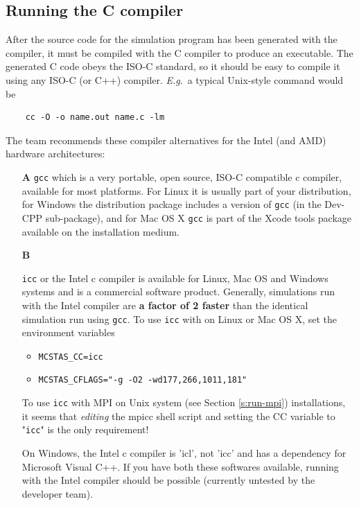 \subsection{Running the C compiler}
\label{s:compile}

After the source code for the simulation program has been generated with
the \MCX compiler, it must be compiled with the C compiler to produce
an executable. The generated C code obeys the ISO-C standard, so it
should be easy to compile it using any ISO-C (or C++) compiler. \textit{E.g}.\ a
typical Unix-style command would be
\begin{verbatim}
    cc -O -o name.out name.c -lm
\end{verbatim}
The \MCX team recommends these compiler alternatives for the Intel
(and AMD) hardware architectures:
\begin{itemize}
\item[\bfseries A]{\verb+gcc+ which is a very portable, open source, ISO-C
    compatible c compiler, available for most platforms. For Linux it
    is usually part of your distribution, for Windows the \MCX
    distribution package includes a version of \verb+gcc+
    (in the Dev-CPP sub-package), and for Mac OS X \verb+gcc+ is part
    of the Xcode tools package available on the installation medium.}
\item[\bfseries B]{\verb+icc+ or the Intel c compiler is available for Linux, Mac
    OS and Windows systems and is a commercial software
    product. Generally, simulations run with the Intel compiler are
    {\bfseries a factor of 2 faster} than the identical simulation run using \verb+gcc+. To use \verb+icc+ with \MCX on Linux or Mac OS X, set the environment variables
    \begin{itemize}
      \item{\verb+MCSTAS_CC=icc+}
      \item{\verb+MCSTAS_CFLAGS="-g -O2 -wd177,266,1011,181"+}
    \end{itemize}
    To use \verb+icc+ with MPI on Unix system (see Section \ref{s:run-mpi})
 installations, it seems that \emph{editing}
    the mpicc shell script and setting the CC variable to "\verb+icc+" is the
    only requirement!}
    On Windows, the Intel c compiler is 'icl', not 'icc' and has a dependency for Microsoft Visual C++. If you have both these softwares available, running \MCX  with the Intel compiler should be possible (currently untested by the \MCX  developer team).

\end{itemize}


